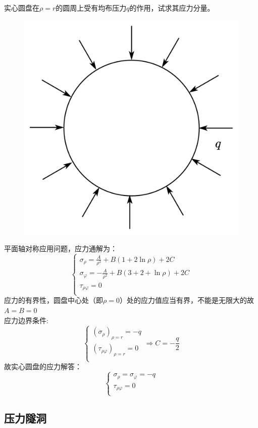 \begin{example}
	实心圆盘在$\rho = r$的圆周上受有均布压力$q$的作用，试求其应力分量。
\end{example}
\begin{figure}
	\centering
	\includegraphics[scale=0.4]{figure/4-6.png}
\end{figure}
	\begin{remark}
		平面轴对称应用问题，应力通解为：
		\begin{equation*}
		\begin{cases}
		\sigma _{\rho}=\frac{A}{\rho ^2}+B\left( 1+2\ln \rho \right) +2C\\
		\sigma _{\varphi}=-\frac{A}{\rho ^2}+B\left( 3+2+\ln \rho \right) +2C\\
		\tau _{\rho \varphi}=0\\
		\end{cases}
		\end{equation*}
		应力的有界性，圆盘中心处（即$\rho=0$）处的应力值应当有界，不能是无限大的故$A=B=0$
		\\
		应力边界条件:\[\begin{cases}
		\left( \sigma _{\rho} \right) _{\rho =r}=-q\\
		\left( \tau _{\rho \varphi} \right) _{\rho =r}=0\\
		\end{cases}\Longrightarrow C=-\frac{q}{2}\]
		故实心圆盘的应力解答：\[\begin{cases}
		\sigma _{\rho}=\sigma _{\varphi}=-q\\
		\tau _{\rho \varphi}=0\\
		\end{cases}\]
	\end{remark}

\subsection{压力隧洞}